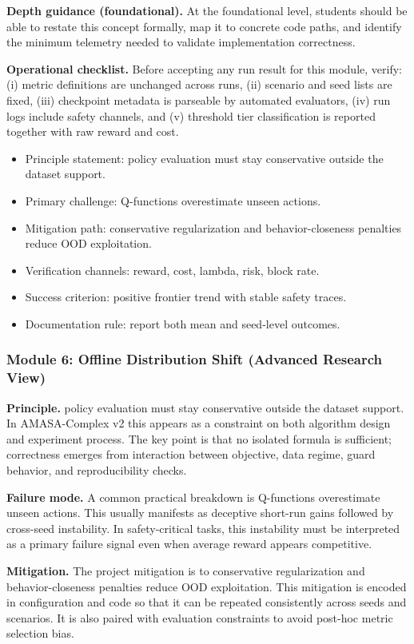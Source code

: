 \documentclass[conference]{IEEEtran}
\begin{document}
\textbf{Depth guidance (foundational).} At the foundational level, students should be able to restate this concept formally, map it to concrete code paths, and identify the minimum telemetry needed to validate implementation correctness.

\textbf{Operational checklist.} Before accepting any run result for this module, verify: (i) metric definitions are unchanged across runs, (ii) scenario and seed lists are fixed, (iii) checkpoint metadata is parseable by automated evaluators, (iv) run logs include safety channels, and (v) threshold tier classification is reported together with raw reward and cost.

\begin{itemize}[leftmargin=*]
  \item Principle statement: policy evaluation must stay conservative outside the dataset support.
  \item Primary challenge: Q-functions overestimate unseen actions.
  \item Mitigation path: conservative regularization and behavior-closeness penalties reduce OOD exploitation.
  \item Verification channels: reward, cost, lambda, risk, block rate.
  \item Success criterion: positive frontier trend with stable safety traces.
  \item Documentation rule: report both mean and seed-level outcomes.
\end{itemize}


\subsubsection{Module 6: Offline Distribution Shift (Advanced Research View)}
\textbf{Principle.} policy evaluation must stay conservative outside the dataset support. In AMASA-Complex v2 this appears as a constraint on both algorithm design and experiment process. The key point is that no isolated formula is sufficient; correctness emerges from interaction between objective, data regime, guard behavior, and reproducibility checks.

\textbf{Failure mode.} A common practical breakdown is Q-functions overestimate unseen actions. This usually manifests as deceptive short-run gains followed by cross-seed instability. In safety-critical tasks, this instability must be interpreted as a primary failure signal even when average reward appears competitive.

\textbf{Mitigation.} The project mitigation is to conservative regularization and behavior-closeness penalties reduce OOD exploitation. This mitigation is encoded in configuration and code so that it can be repeated consistently across seeds and scenarios. It is also paired with evaluation constraints to avoid post-hoc metric selection bias.
\end{document}
